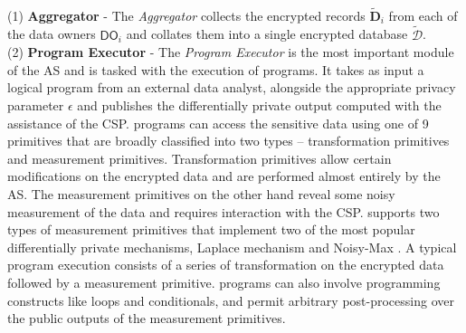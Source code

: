 \\
(1)\textbf{  Aggregator} - The \textit{Aggregator} collects the encrypted records $\mathbf{\tilde{D}}_i$ from each of the data owners $\textsf{DO}_i$ and collates them into a single encrypted database $\boldsymbol{\tilde{\mathcal{D}}}$. %
\\(2)\textbf{ Program Executor }- The \textit{Program Executor} is the most important module of the \textsf{AS} and is tasked with the execution of \system programs. It takes as input a logical \system program from an external data analyst, alongside the appropriate privacy parameter $\epsilon$ and publishes the differentially private output computed with the assistance of the \textsf{CSP}. \system programs can access the sensitive data using one of 9 primitives that are  broadly classified into two types -- transformation primitives and measurement primitives. Transformation primitives allow certain modifications on the encrypted data and are performed almost entirely by the \textsf{AS}. The measurement primitives on the other hand reveal some noisy measurement of the data and requires interaction with the \textsf{CSP}. \system supports two types of measurement primitives that implement two of the most popular differentially private mechanisms, Laplace mechanism \cite{Dork} and Noisy-Max \cite{Dork}. A typical \system program execution consists of  a series of transformation on the encrypted data followed by a measurement primitive. \system programs can also involve programming constructs like loops and conditionals, and permit arbitrary post-processing over the public outputs of the measurement primitives.  
 


